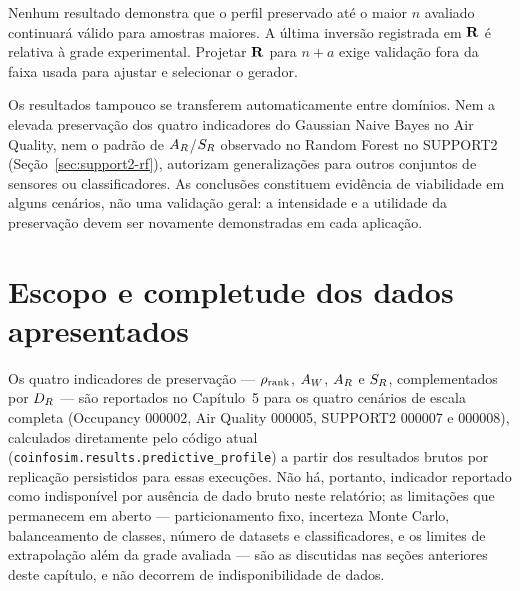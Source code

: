 Nenhum resultado demonstra que o perfil preservado até o maior $n$ avaliado continuará válido para amostras maiores. A última inversão registrada em $\mathbf{R}$ é relativa à grade experimental. Projetar $\mathbf{R}$ para $n+a$ exige validação fora da faixa usada para ajustar e selecionar o gerador.

Os resultados tampouco se transferem automaticamente entre domínios. Nem a elevada preservação dos quatro indicadores do Gaussian Naive Bayes no Air Quality, nem o padrão de $A_R$/$S_R$ observado no Random Forest no SUPPORT2 (Seção~\ref{sec:support2-rf}), autorizam generalizações para outros conjuntos de sensores ou classificadores. As conclusões constituem evidência de viabilidade em alguns cenários, não uma validação geral: a intensidade e a utilidade da preservação devem ser novamente demonstradas em cada aplicação.

\section{Escopo e completude dos dados apresentados}

Os quatro indicadores de preservação --- $\rho_{\mathrm{rank}}$, $A_W$, $A_R$ e $S_R$, complementados por $D_R$ --- são reportados no Capítulo~5 para os quatro cenários de escala completa (Occupancy 000002, Air Quality 000005, SUPPORT2 000007 e 000008), calculados diretamente pelo código atual (\texttt{coinfosim.results.predictive\_profile}) a partir dos resultados brutos por replicação persistidos para essas execuções. Não há, portanto, indicador reportado como indisponível por ausência de dado bruto neste relatório; as limitações que permanecem em aberto --- particionamento fixo, incerteza Monte Carlo, balanceamento de classes, número de datasets e classificadores, e os limites de extrapolação além da grade avaliada --- são as discutidas nas seções anteriores deste capítulo, e não decorrem de indisponibilidade de dados.
